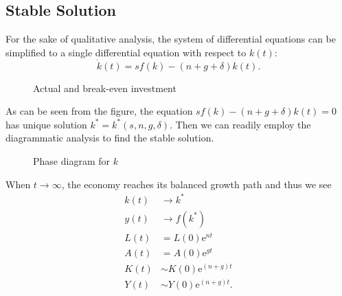 \documentclass[12pt]{article} %
\newcommand{\e}{\mathrm{e}}
\begin{document}
\subsection{Stable Solution} %
For the sake of qualitative analysis, the system of differential equations can be simplified to a single differential equation with respect to $k(t)$:
\[
\dot{k}(t)=sf(k)-(n+g+\delta)k(t).
\]
\begin{figure}[H] %
	\caption{Actual and break-even investment}
	\label{fig:speciation}
\end{figure}
As can be seen from the figure, the equation $sf(k)-(n+g+\delta)k(t)=0$ has unique solution $k^*=k^*(s,n,g,\delta)$. Then we can readily employ the diagrammatic analysis to find the stable solution.
\begin{figure}[H] %
	\caption{\small Phase diagram for $k$}
	\label{fig:speciation}
\end{figure}
When $t\rightarrow\infty$, the economy reaches its balanced growth path and thus we see
\begin{align*}
k(t) & \rightarrow k^*\\
y(t) & \rightarrow f(k^*)\\
L(t) & =L(0)\e^{nt} \\
A(t) & =A(0)\e^{gt} \\
K(t) & \sim K(0)\e^{(n+g)t}\\
Y(t) & \sim Y(0)\e^{(n+g)t}.
\end{align*}
\end{document}
